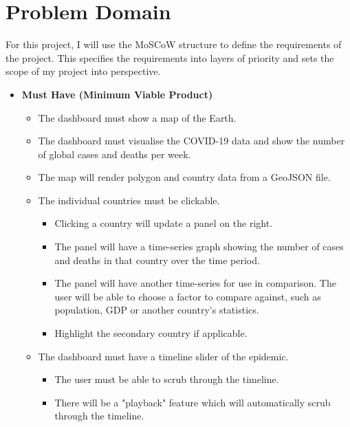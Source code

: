 \documentclass{report}
\begin{document}
\newpage


\chapter{Problem Domain}
For this project, I will use the MoSCoW structure to define the requirements of the project. This specifies the requirements into layers of priority and sets the scope of my project into perspective.\\
\begin{itemize}
    \item \textbf{\Large{Must Have (Minimum Viable Product)}}
    \begin{itemize}
        \item The dashboard must show a map of the Earth.
        \item The dashboard must visualise the COVID-19 data and show the number of global cases and deaths per week.
        \item The map will render polygon and country data from a GeoJSON file.
        \item The individual countries must be clickable.
        \begin{itemize}
            \item Clicking a country will update a panel on the right.
            \item The panel will have a time-series graph showing the number of cases and deaths in that country over the time period.
            \item The panel will have another time-series for use in comparison. The user will be able to choose a factor to compare against, such as population, GDP or another country's statistics.
            \item Highlight the secondary country if applicable.
        \end{itemize}
        \item The dashboard must have a timeline slider of the epidemic.
        \begin{itemize}
            \item The user must be able to scrub through the timeline.
            \item There will be a "playback" feature which will automatically scrub through the timeline.

\end{itemize}
\end{itemize}
\end{itemize}
\end{document}
